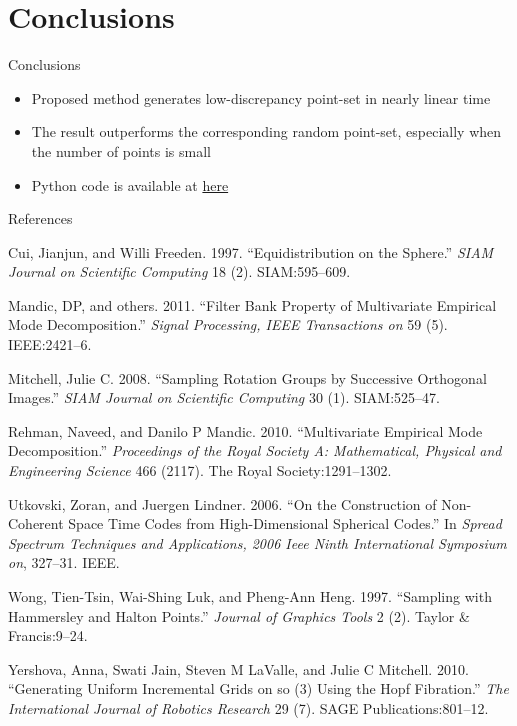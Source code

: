 \hypertarget{conclusions}{%
\section{Conclusions}\label{conclusions}}

\begin{frame}{Conclusions}
\protect\hypertarget{conclusions-1}{}

\begin{itemize}
\item
  Proposed method generates low-discrepancy point-set in nearly linear
  time
\item
  The result outperforms the corresponding random point-set, especially
  when the number of points is small
\item
  Python code is available at
  \href{http://github.com/luk036/n-sphere/}{here}
\end{itemize}

\end{frame}

\begin{frame}[allowframebreaks]{References}
\protect\hypertarget{references}{}

\hypertarget{refs}{}
\leavevmode\hypertarget{ref-cui1997equidistribution}{}%
Cui, Jianjun, and Willi Freeden. 1997. “Equidistribution on the Sphere.”
\emph{SIAM Journal on Scientific Computing} 18 (2). SIAM:595–609.

\leavevmode\hypertarget{ref-mandic2011filter}{}%
Mandic, DP, and others. 2011. “Filter Bank Property of Multivariate
Empirical Mode Decomposition.” \emph{Signal Processing, IEEE
Transactions on} 59 (5). IEEE:2421–6.

\leavevmode\hypertarget{ref-mitchell2008sampling}{}%
Mitchell, Julie C. 2008. “Sampling Rotation Groups by Successive
Orthogonal Images.” \emph{SIAM Journal on Scientific Computing} 30 (1).
SIAM:525–47.

\leavevmode\hypertarget{ref-rehman2010multivariate}{}%
Rehman, Naveed, and Danilo P Mandic. 2010. “Multivariate Empirical Mode
Decomposition.” \emph{Proceedings of the Royal Society A: Mathematical,
Physical and Engineering Science} 466 (2117). The Royal
Society:1291–1302.

\leavevmode\hypertarget{ref-utkovski2006construction}{}%
Utkovski, Zoran, and Juergen Lindner. 2006. “On the Construction of
Non-Coherent Space Time Codes from High-Dimensional Spherical Codes.” In
\emph{Spread Spectrum Techniques and Applications, 2006 Ieee Ninth
International Symposium on}, 327–31. IEEE.

\leavevmode\hypertarget{ref-wong1997sampling}{}%
Wong, Tien-Tsin, Wai-Shing Luk, and Pheng-Ann Heng. 1997. “Sampling with
Hammersley and Halton Points.” \emph{Journal of Graphics Tools} 2 (2).
Taylor \& Francis:9–24.

\leavevmode\hypertarget{ref-yershova2010generating}{}%
Yershova, Anna, Swati Jain, Steven M LaValle, and Julie C Mitchell.
2010. “Generating Uniform Incremental Grids on so (3) Using the Hopf
Fibration.” \emph{The International Journal of Robotics Research} 29
(7). SAGE Publications:801–12.

\end{frame}
